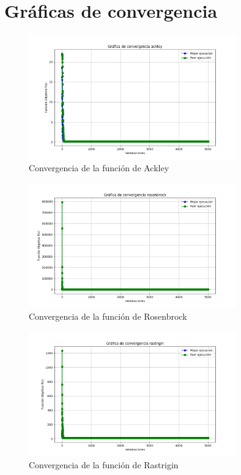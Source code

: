 \documentclass{report}
\begin{document}
    \section{Gráficas de convergencia}
    \begin{figure}[H]
        \centering
        \includegraphics[width=0.8\textwidth]{Ackley.png}
        \caption{Convergencia de la función de Ackley}
        \label{fig:ackley}
    \end{figure}
    \begin{figure}[H]
        \centering
        \includegraphics[width=0.8\textwidth]{Rosenbrock.png}
        \caption{Convergencia de la función de Rosenbrock}
        \label{fig:rosenbrock}
    \end{figure}
    \begin{figure}[H]
        \centering
        \includegraphics[width=0.8\textwidth]{rastrigin.png}
        \caption{Convergencia de la función de Rastrigin}
        \label{fig:rastrigin}
    \end{figure}
\end{document}
